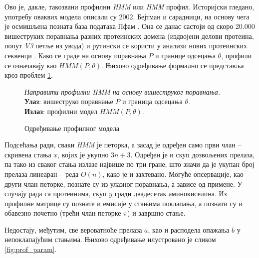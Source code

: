\documentclass[12pt,oneside]{memoir}
\newenvironment{problem}[1][!ht]
{\renewcommand{\algorithmcfname}{Проблем}
\begin{figure}[!ht]
\centering
  \begin{minipage}{.94\linewidth}
	\begin{algorithm}[#1]%
  }{\end{algorithm}
  \end{minipage}
\end{figure}}
\begin{document}
\begin{CJK}{UTF8}{ipxm}
Ово је, дакле, такозвани профилни \textit{HMM} или \textit{HMM} профил. Историјски гледано, употребу оваквих модела описали су 2002. Бејтман и сарадници, на основу чега је осмишљена позната база података Пфам \cite{bateman2002}. Она се данас састоји од скоро 20.000 вишеструких поравнања разних протеинских домена (издвојени делови протеина, попут \textit{V3} петље из увода) и рутински се користи у анализи нових протеинских секвенци \cite{pfam}. Како се граде на основу поравнања $P$ и границе одсецања $\theta$, профили се означавају као $HMM(P, \theta)$. Њихово одређивање формално се представља кроз проблем \ref{prob:prof}.

\begin{problem}[H]
  \SetAlgoLined
  \textit{Направити профилни \textit{HMM} на основу вишеструког поравнања.}\\
  \textbf{Улаз}: вишеструко поравнање $P$ и граница одсецања $\theta$.\\
  \textbf{Излаз}: профилни модел $HMM(P, \theta)$.
  \caption{Одређивање профилног модела \cite{ba10e}}
  \label{prob:prof}
\end{problem}

Подсећања ради, сваки \textit{HMM} је петорка, а засад је одређен само први члан -- скривена стања $x$, којих је укупно $3n+3$. Одређен је и скуп дозвољених прелаза, па тако из сваког стања излазе највише по три гране, што значи да је укупан број прелаза линеаран -- реда $O(n)$, како је и захтевано. Могуће опсервације, као други члан петорке, познате су из улазног поравнања, а зависе од примене. У случају рада са протеинима, скуп $y$ гради двадесетак аминокиселина. Из профилне матрице су познате и емисије у стањима поклапања, а познати су и обавезно почетно (трећи члан петорке $\pi$) и завршно стање.

Недостају, међутим, све вероватноће прелаза $a$, као и расподела опажања $b$ у непоклапајућим стањима. Њихово одређивање илустровано је сликом \ref{fig:prof_param}.


\end{CJK}
\end{document}

